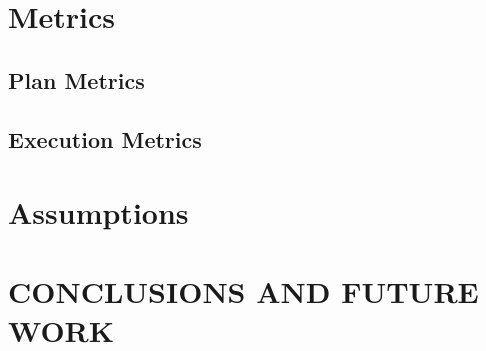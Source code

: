 

\section{Metrics}
\subsection{Plan Metrics}
\label{sect:PlanMetrics}

\subsection{Execution Metrics}
\label{sect:ExecutionMetrics}





\section{Assumptions}
\label{sect:Assumptions}


\addtolength{\textheight}{-15cm}   %


\section{CONCLUSIONS AND FUTURE WORK}
\label{sect:Conclusions}





